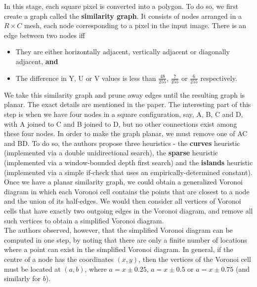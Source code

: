 \documentclass[a4paper,9pt]{article}
\begin{document}
In this stage, each square pixel is converted into a polygon. To do so, we first create a graph called the \textbf{similarity graph}. It consists of nodes arranged in a $R \times C$ mesh, each node corresponding to a pixel in the input image. There is an edge between two nodes iff\\

\begin{itemize}

\item They are either horizontally adjacent, vertically adjacent or diagonally adjacent, \textbf{and}
\item The difference in Y, U or V values is less than $\frac{48}{255}$, $\frac{7}{255}$ or $\frac{6}{255}$ respectively.

\end{itemize}

We take this similarity graph and prune away edges until the resulting graph is planar. The exact details are mentioned in the paper. The interesting part of this step is when we have four nodes in a square configuration, say, A, B, C and D, with A joined to C and B joined to D, but no other connections exist among these four nodes. In order to make the graph planar, we must remove one of AC and BD. To do so, the authors propose three heuristics - the \textbf{curves} heuristic (implemented via a double unidirectional search), the \textbf{sparse} heuristic (implemented via a window-bounded depth first search) and the \textbf{islands} heuristic (implemented via a simple if-check that uses an empirically-determined constant).\\

Once we have a planar similarity graph, we could obtain a generalized Voronoi diagram in which each Voronoi cell contains the points that are closest to a node and the union of its half-edges. We would then consider all vertices of Voronoi cells that have exactly two outgoing edges in the Voronoi diagram, and remove all such vertices to obtain a simplified Voronoi diagram.\\

The authors observed, however, that the simplified Voronoi diagram can be computed in one step, by noting that there are only a finite number of locations where a point can exist in the simplified Voronoi diagram. In general, if the centre of a node has the coordinates $(x, y)$, then the vertices of the Voronoi cell must be located at $(a, b)$, where $a = x \pm 0.25$, $a = x \pm 0.5$ or $a = x \pm 0.75$ (and similarly for $b$).\\
\end{document}
